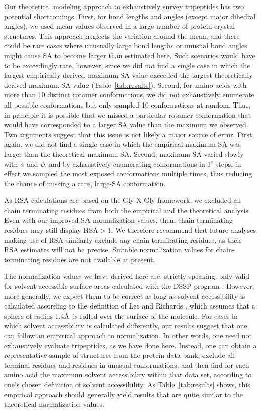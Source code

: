 \documentclass[11pt]{article}
\begin{document}
Our theoretical modeling approach to exhaustively survey tripeptides has two potential shortcomings. First, for bond lengths and angles (except major dihedral angles), we used mean values observed in a large number of protein crystal structures. This approach neglects the variation around the mean, and there could be rare cases where unusually large bond lengths or unusual bond angles might cause SA to become larger than estimated here. Such scenarios would have to be exceedingly rare, however, since we did not find a single case in which the largest empirically derived maximum SA value exceeded the largest theoretically derived maximum SA value (Table~\ref{tab:results}). Second, for amino acids with more than 10 distinct rotamer conformations, we did not exhaustively enumerate all possible conformations but only sampled 10 conformations at random. Thus, in principle it is possible that we missed a particular rotamer conformation that would have corresponded to a larger SA value than the maximum we observed. Two arguments suggest that this issue is not likely a major source of error. First, again, we did not find a single case in which the empirical maximum SA was larger than the theoretical maximum SA. Second, maximum SA varied slowly with $\phi$ and $\psi$, and by exhaustively enumerating conformations in $1^\circ$ steps, in effect we sampled the most exposed conformations multiple times, thus reducing the chance of missing a rare, large-SA conformation.

As RSA calculations are based on the Gly-X-Gly framework, we excluded all chain terminating residues from both the empirical and the theoretical analysis. Even with our improved SA normalization values, then, chain-terminating residues may still display $\text{RSA}>1$. We therefore recommend that future analyses making use of RSA similarly exclude any chain-terminating residues, as their RSA estimates will not be precise. Suitable normalization values for chain-terminating residues are not available at present. 

The normalization values we have derived here are, strictly speaking, only valid for solvent-accessible surface areas calculated with the DSSP program \cite{Kabsch1983}. However, more generally, we expect them to be correct as long as solvent accessibility is calculated according to the definition of Lee and Richards \cite{LeeRichards1971}, which assumes that a sphere of radius 1.4\AA\ is rolled over the surface of the molecule. For cases in which solvent accessibility is calculated differently, our results suggest that one can follow an empirical approach to normalization. In other words, one need not exhaustively evaluate tripeptides, as we have done here. Instead, one can obtain a representative sample of structures from the protein data bank, exclude all terminal residues and residues in unusual conformations, and then find for each amino acid the maximum solvent accessibility within that data set, according to one's chosen definition of solvent accessibility. As Table~\ref{tab:results} shows, this empirical approach should generally yield results that are quite similar to the theoretical normalization values.
\end{document}
